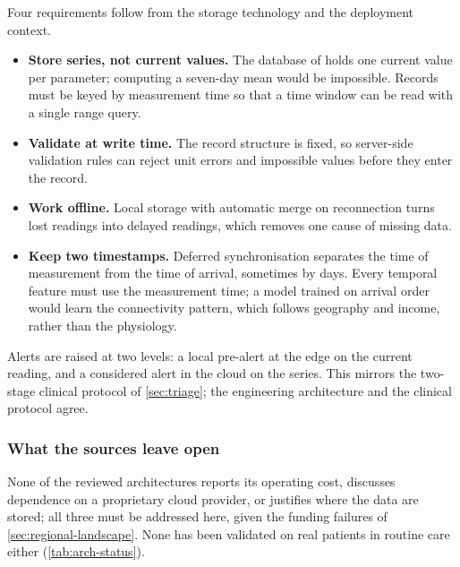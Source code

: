 Four requirements follow from the storage technology and the deployment context.
\begin{itemize}[nosep]
  \item \textbf{Store series, not current values.} The database of \textcite{efendi2025} holds one current value per parameter; computing a seven-day mean would be impossible. Records must be keyed by measurement time so that a time window can be read with a single range query.
  \item \textbf{Validate at write time.} The record structure is fixed, so server-side validation rules can reject unit errors and impossible values before they enter the record.
  \item \textbf{Work offline.} Local storage with automatic merge on reconnection turns lost readings into delayed readings, which removes one cause of missing data.
  \item \textbf{Keep two timestamps.} Deferred synchronisation separates the time of measurement from the time of arrival, sometimes by days. Every temporal feature must use the measurement time; a model trained on arrival order would learn the connectivity pattern, which follows geography and income, rather than the physiology.
\end{itemize}
Alerts are raised at two levels: a local pre-alert at the edge on the current reading, and a considered alert in the cloud on the series. This mirrors the two-stage clinical protocol of \cref{sec:triage}; the engineering architecture and the clinical protocol agree.

\subsubsection{What the sources leave open}\label{sec:cloud-gaps}\label{sec:arch-validation}\label{sec:usability-result}

None of the reviewed architectures reports its operating cost, discusses dependence on a proprietary cloud provider, or justifies where the data are stored; all three must be addressed here, given the funding failures of \cref{sec:regional-landscape}. None has been validated on real patients in routine care either (\cref{tab:arch-status}).

